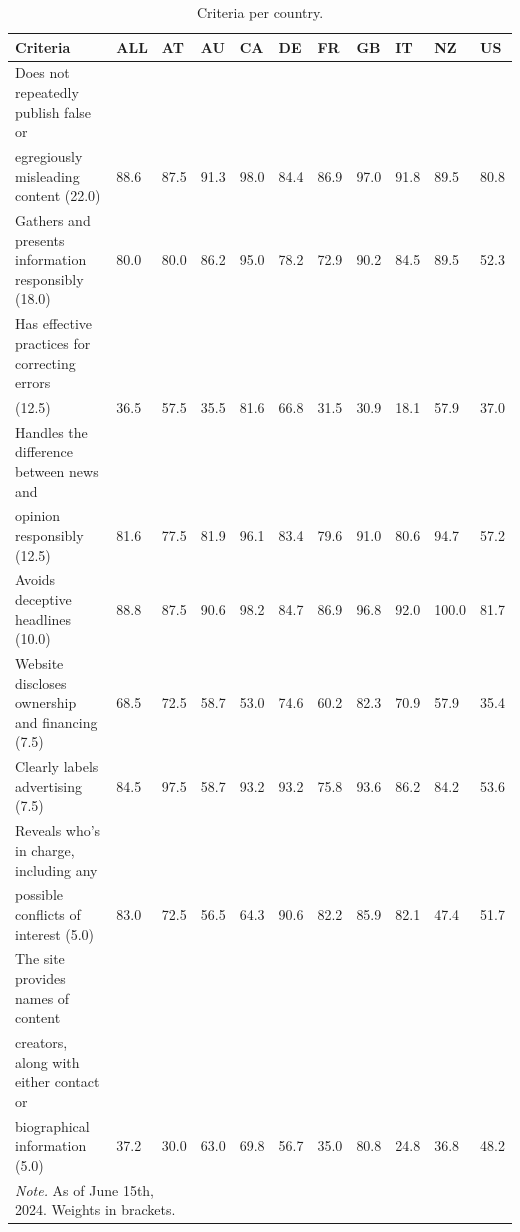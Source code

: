 \begin{table}[H]
\centering
\caption{Criteria per country.}
\label{table:table3}
\begin{tabularx}{\textwidth}{ l X X X X X X X X X X }
\toprule
                                                                                                      Criteria &  ALL &   AT &   AU &   CA &   DE &   FR &   GB &   IT &    NZ &   US \\
\midrule
                                 Does not repeatedly publish false or \\ egregiously misleading content (22.0) & 88.6 & 87.5 & 91.3 & 98.0 & 84.4 & 86.9 & 97.0 & 91.8 &  89.5 & 80.8 \\
                                                           Gathers and presents information responsibly (18.0) & 80.0 & 80.0 & 86.2 & 95.0 & 78.2 & 72.9 & 90.2 & 84.5 &  89.5 & 52.3 \\
                                                       Has effective practices for correcting errors \\ (12.5) & 36.5 & 57.5 & 35.5 & 81.6 & 66.8 & 31.5 & 30.9 & 18.1 &  57.9 & 37.0 \\
                                         Handles the difference between news and \\ opinion responsibly (12.5) & 81.6 & 77.5 & 81.9 & 96.1 & 83.4 & 79.6 & 91.0 & 80.6 &  94.7 & 57.2 \\
                                                                             Avoids deceptive headlines (10.0) & 88.8 & 87.5 & 90.6 & 98.2 & 84.7 & 86.9 & 96.8 & 92.0 & 100.0 & 81.7 \\
                                                               Website discloses ownership and financing (7.5) & 68.5 & 72.5 & 58.7 & 53.0 & 74.6 & 60.2 & 82.3 & 70.9 &  57.9 & 35.4 \\
                                                                              Clearly labels advertising (7.5) & 84.5 & 97.5 & 58.7 & 93.2 & 93.2 & 75.8 & 93.6 & 86.2 &  84.2 & 53.6 \\
                                Reveals who's in charge, including any \\ possible conflicts of interest (5.0) & 83.0 & 72.5 & 56.5 & 64.3 & 90.6 & 82.2 & 85.9 & 82.1 &  47.4 & 51.7 \\
The site provides names of content \\ creators, along with either contact or \\ biographical information (5.0) & 37.2 & 30.0 & 63.0 & 69.8 & 56.7 & 35.0 & 80.8 & 24.8 &  36.8 & 48.2 \\
\bottomrule
\multicolumn{3}{l}{\textit{Note.} As of June 15th, 2024. Weights in brackets.}
\end{tabularx}
\end{table}
